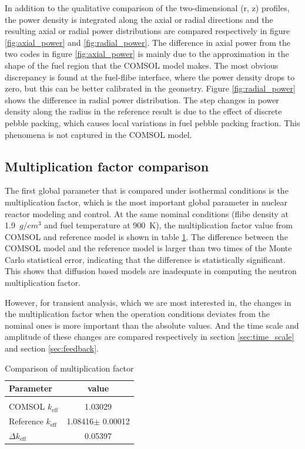\documentclass{elsarticle}
\newcommand{\keff}{{\ensuremath{k_{\mathrm{eff}}}} }
\begin{document}
In addition to the qualitative comparison of the two-dimensional (r, z) profiles, the power density is integrated along the axial or radial directions and the resulting axial or radial power distributions are compared respectively in figure \ref{fig:axial_power} and \ref{fig:radial_power}. 
The difference in axial power from the two codes in figure \ref{fig:axial_power} is mainly due to the approximation in the shape of the fuel region that the COMSOL model makes. The most obvious discrepancy is found at the fuel-flibe interface, where the power density drops to zero, but this can be better calibrated in the geometry.
Figure \ref{fig:radial_power} shows the difference in radial power distribution. The step changes in power density along the radius in the reference result is due to the effect of discrete pebble packing, which causes local variations in fuel pebble packing fraction. This phenomena is not captured in the COMSOL model.





\subsection{Multiplication factor comparison}
The first global parameter that is compared under isothermal conditions is the multiplication factor, which is the most important global parameter in nuclear reactor modeling and control. 
At the same nominal conditions (flibe density at 1.9~$g/cm^3$ and fuel temperature at 900~K), the multiplication factor value from COMSOL and reference model is shown in table \ref{tab:keff}. The difference between the COMSOL model and the reference model is larger than two times of the Monte Carlo statistical error, indicating that the difference is statistically significant. This shows that diffusion based models are inadequate in computing the neutron multiplication factor. 

However, for transient analysis, which we are most interested in, the changes in the multiplication factor when the operation conditions deviates from the nominal ones is more important than the absolute values.
And the time scale and amplitude of these changes are compared respectively in section \ref{sec:time_scale} and section \ref{sec:feedback}.

\begin{table}
\centering
  \begin{tabular}{lc}
  \hline
        Parameter & value \\
        \hline\\
       COMSOL \keff & 1.03029  \\
       Reference \keff & 1.08416$\pm$ 0.00012\\
       $\Delta$\keff & 0.05397\\
       \hline
  \end{tabular}
  \caption{Comparison of multiplication factor}
  \label{tab:keff}
\end{table}
\end{document}
